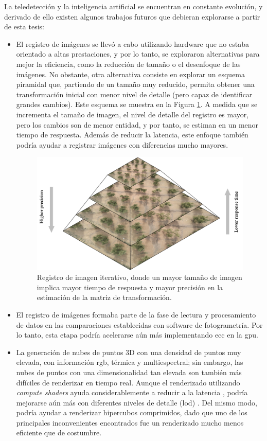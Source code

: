 La teledetección y la inteligencia artificial se encuentran en constante evolución, y derivado de ello existen algunos trabajos futuros que debieran explorarse a partir de esta tesis:
\begin{itemize}
    \item El registro de imágenes se llevó a cabo utilizando hardware que no estaba orientado a altas prestaciones, y por lo tanto, se exploraron alternativas para mejor la eficiencia, como la reducción de tamaño o el desenfoque de las imágenes. No obstante, otra alternativa consiste en explorar un esquema piramidal que, partiendo de un tamaño muy reducido, permita obtener una transformación inicial con menor nivel de detalle (pero capaz de identificar grandes cambios). Este esquema se muestra en la Figura \ref{fig:image_pyramid_spanish}. A medida que se incrementa el tamaño de imagen, el nivel de detalle del registro es mayor, pero los cambios son de menor entidad, y por tanto, se estiman en un menor tiempo de respuesta. Además de reducir la latencia, este enfoque también podría ayudar a registrar imágenes con diferencias mucho mayores.
    \begin{figure}
        \centering
        \includegraphics[width=\linewidth]{figs/conclusions/image_pyramid.png}
        \caption{Registro de imagen iterativo, donde un mayor tamaño de imagen implica mayor tiempo de respuesta y mayor precisión en la estimación de la matriz de transformación.}
        \label{fig:image_pyramid_spanish}
    \end{figure}
    \item El registro de imágenes formaba parte de la fase de lectura y procesamiento de datos en las comparaciones establecidas con software de fotogrametría. Por lo tanto, esta etapa podría acelerarse aún más implementando \acrshort{ecc} en la \acrshort{gpu}.
    \item La generación de nubes de puntos 3D con una densidad de puntos muy elevada, con información \acrshort{rgb}, térmica y multiespectral; sin embargo, las nubes de puntos con una dimensionalidad tan elevada son también más difíciles de renderizar en tiempo real. Aunque el renderizado utilizando \textit{compute shaders} ayuda considerablemente a reducir a la latencia \cite{schutz_rendering_2021}, podría mejorarse aún más con diferentes niveles de detalle (\acrshort{lod}) \cite{schutz_gpu-accelerated_2023}. Del mismo modo, podría ayudar a renderizar hipercubos comprimidos, dado que uno de los principales inconvenientes encontrados fue un renderizado mucho menos eficiente que de costumbre.

\end{itemize}
